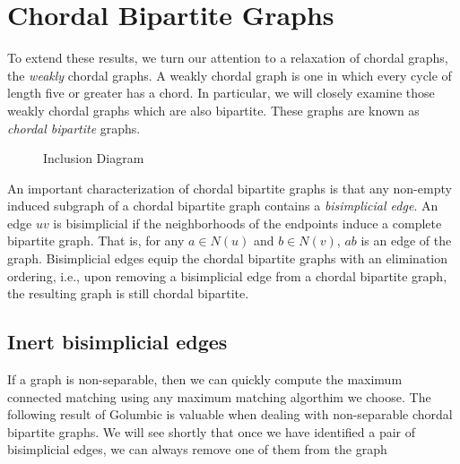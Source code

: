 \section{Chordal Bipartite Graphs}

To extend these results, we turn our attention to a relaxation of chordal graphs, the {\it weakly} chordal graphs. 
%
A weakly chordal graph is one in which every cycle of length five or greater has a chord.  
%
In particular, we will closely examine those weakly chordal graphs which are also bipartite.  
%
These graphs are known as {\it chordal bipartite} graphs.  
\begin{figure}
	\begin{center}
		
	\end{center}
	\label{inclusion}
	\caption{Inclusion Diagram}
\end{figure}

An important characterization of chordal bipartite graphs is that any non-empty induced subgraph of a chordal bipartite graph contains a {\it bisimplicial edge}.  
%
An edge $uv$ is bisimplicial if the neighborhoods of the endpoints induce a complete bipartite graph.  
%
That is, for any $a\in N(u)$ and $b\in N(v)$, $ab$ is an edge of the graph.  
%
Bisimplicial edges equip the chordal bipartite graphs with an elimination ordering, i.e., upon removing a bisimplicial edge from a chordal bipartite graph, the resulting graph is still chordal bipartite.

\subsection{Inert bisimplicial edges}
If a graph is non-separable, then we can quickly compute the maximum connected matching using any maximum matching algorthim we choose.  
%
The following result of Golumbic is valuable when dealing with non-separable chordal bipartite graphs.
%
%
We will see shortly that once we have identified a pair of bisimplicial edges, we can always remove one of them from the graph  
%

